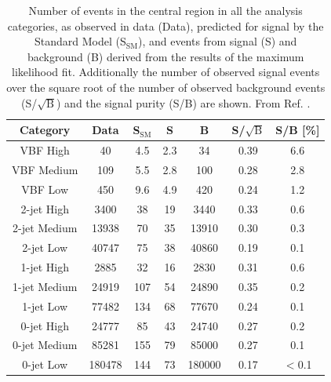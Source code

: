 \begin{table}[htb]
  \centering
  \caption{
  Number of events in the central region in all the analysis categories,
  as observed in data (Data), predicted for signal by the Standard Model
  (S$_\text{SM}$), and events from signal (S) and background (B) derived
  from the results of the maximum likelihood fit. Additionally the
  number of observed signal events over the square root of the number of
  observed background events (S/$\sqrt{\text{B}}$) and the signal purity
  (S/B) are shown. From Ref. \cite{ATLAS-CONF-2019-028}.
  }
  \label{tab:hmumu:results}
  \begin{tabular}{ c c c c c c c }
    \toprule
    Category        & Data     & S$_\text{SM}$  &   S     &    B     & S/$\sqrt{\text{B}}$ & S/B [\%] \\
    \midrule
    VBF High        & 40       &  4.5           &  2.3    & 34       &  0.39               &  6.6 \\
    VBF Medium      & 109      &  5.5           &  2.8    & 100      &  0.28               &  2.8 \\
    VBF Low         & 450      &  9.6           &  4.9    & 420      &  0.24               &  1.2 \\
    2-jet High      & 3400     &    38          &  19     & 3440     &  0.33               &  0.6 \\
    2-jet Medium    & 13938    &    70          &  35     & 13910    &  0.30               &  0.3 \\
    2-jet Low       & 40747    &    75          &  38     & 40860    &  0.19               &  0.1 \\
    1-jet High      & 2885     &    32          &  16     &  2830    &  0.31               &  0.6 \\
    1-jet Medium    & 24919    &  107           &  54     & 24890    &  0.35               &  0.2 \\
    1-jet Low       & 77482    &  134           &  68     & 77670    &  0.24               &  0.1 \\
    0-jet High      & 24777    &  85            &  43     & 24740    &  0.27               &  0.2 \\
    0-jet Medium    & 85281    &  155           &  79     & 85000    &  0.27               &  0.1 \\
    0-jet Low       & 180478   &  144           &  73     & 180000   &  0.17               &  $<$0.1 \\
    \bottomrule
  \end{tabular}
\end{table}

